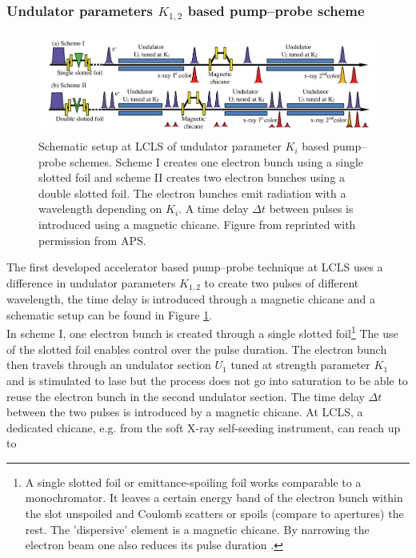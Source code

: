 \subsubsection{Undulator parameters $K_{1,2}$ based pump--probe scheme}
\begin{figure}
	\centering
		\includegraphics[width=1.00\textwidth]{images/Albertos-pump-probe-scheme.png}
	\caption[Schematic setup of undulator based pump--probe scheme.]{Schematic setup at LCLS of undulator parameter $K_{i}$ based pump--probe schemes. Scheme I creates one electron bunch using a single slotted foil and scheme II creates two electron bunches using a double slotted foil. The electron bunches emit radiation with a wavelength depending on $K_{i}$. A time delay $\Delta t$ between pulses is introduced using a magnetic chicane. Figure from \cite{Lutman-2013-PRL} reprinted with permission from APS.}
	\label{fig:Albertos-pump-probe-scheme}
\end{figure}
The first developed accelerator based pump--probe technique at LCLS \cite{Lutman-2013-PRL} uses a difference in undulator parameters $K_{1,2}$ to create two pulses of different wavelength, the time delay is introduced through a magnetic chicane and a schematic setup can be found in Figure \ref{fig:Albertos-pump-probe-scheme}.\\
In scheme I, one electron bunch is created through a single slotted foil\footnote{A single slotted foil or emittance-spoiling foil works comparable to a monochromator. It leaves a certain energy band of the electron bunch within the slot unspoiled and Coulomb scatters or spoils (compare to apertures) the rest. The 'dispersive' element is a magnetic chicane. By narrowing the electron beam one also reduces its pulse duration \cite{Emma-2004-PRL}.}  The use of the slotted foil enables control over the pulse duration. The electron bunch then travels through an undulator section $U_{1}$ tuned at strength parameter $K_{1}$ and is stimulated to lase but the process does not go into saturation to be able to reuse the electron bunch in the second undulator section. The time delay $\Delta t$ between the two pulses is introduced by a magnetic chicane. At LCLS, a dedicated chicane, e.g. from the soft X-ray self-seeding instrument, can reach up to
